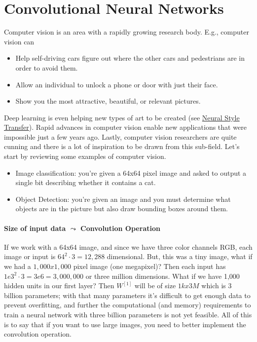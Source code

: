 \documentclass[12pt]{article}
\begin{document}
\section{Convolutional Neural Networks} Computer vision is an area with a rapidly growing research body. E.g.,
computer vision can
\begin{itemize} 
\item Help self-driving cars figure out where the other cars and pedestrians are in order to avoid them.
\item Allow an individual to unlock a phone or door with just their face.
\item Show you the most attractive, beautiful, or relevant pictures. \end{itemize}

Deep learning is even helping new types of art to be created (see \href{https://en.wikipedia.org/wiki/Neural_Style_Transfer}{Neural Style Transfer}). Rapid advances in computer vision enable new applications
that were impossible just a few years ago. Lastly, computer vision researchers are quite cunning and there is a lot of
inspiration to be drawn from this sub-field. Let's start by reviewing some examples of computer vision.
\begin{itemize}   \item Image classification: you're given a 64x64 pixel image and asked to output a single bit describing 
    whether it contains a cat.
  \item Object Detection: you're given an image and you must determine what objects are in the picture but also draw bounding boxes around them. \end{itemize}

\paragraph{Size of input data $\leadsto$ Convolution Operation} 
If we work with a 64x64 image, and since we have three color channels RGB, each image or input is
$64^2 \cdot 3 = 12,288$ dimensional. But, this was a tiny image, what if we had a $1,000 x 1,000$ pixel image (one megapixel)? Then
each input has $1e3^2 \cdot 3 = 3e6 = 3,000,000$ or three million dimensions. What if we have 1,000 hidden units in our first layer?
Then $W^{[1]}$ will be of size $1k x 3M$ which is 3 billion parameters; with that many parameters it's difficult to get enough
data to prevent overfitting, and further the computational (and memory) requirements to train a neural network with three billion
parameters is not yet feasible. All of this is to say that if you want to use large images, you need to better implement the
convolution operation.
\end{document}
